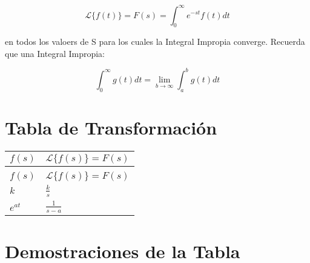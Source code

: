\documentclass[12pt]{report}                                %
\begin{document}
        \begin{equation}   
            \mathscr{L}\{f(t)\} = F(s) = \int_0^\infty e^{-st} f(t) dt 
        \end{equation}    


        en todos los valoers de S para los cuales la Integral Impropia converge.
        Recuerda que una Integral Impropia:

        \begin{equation*}   
            \int_0^\infty g(t) dt = \lim_{b \to \infty} \int_a^b g(t) dt
        \end{equation*}  


    \clearpage
    \section{Tabla de Transformación}

        \begin{longtable}{p{60mm} || p{70mm}}
            \renewcommand{\arraystretch}{1.5}
            \Huge $f(s)$ & \Huge $\mathscr{L}\{f(s)\} = F(s)$                                   \\ [1.5ex] 
            \hline\hline                                                                        \\
            \endfirsthead   
            \Huge $f(s)$ & \Huge $\mathscr{L}\{f(s)\} = F(s)$                                   \\ [1.5ex]
            \hline\hline                                                                   
            \endhead

            \Large $k$                               &\Large               $\frac{k}{s}$        \\ [3.0ex]
            \Large $e^{at}$                          &\Large                $\frac{1}{s-a}$     \\ [3.0ex]

        \end{longtable}


    \clearpage
    \section{Demostraciones de la Tabla}
\end{document}
